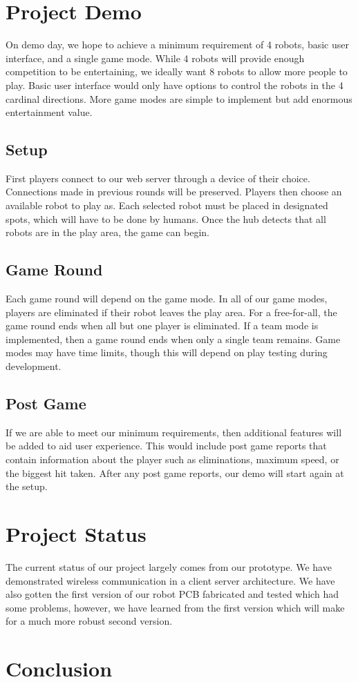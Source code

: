 \documentclass[11pt]{ieeeconf}
\begin{document}
\section{Project Demo}

On demo day, we hope to achieve a minimum requirement of 4 robots, basic user interface, and a single game mode. While 4 robots will provide enough competition to be entertaining, we ideally want 8 robots to allow more people to play. Basic user interface would only have options to control the robots in the 4 cardinal directions. More game modes are simple to implement but add enormous entertainment value.

\subsection{Setup}
First players connect to our web server through a device of their choice. Connections made in previous rounds will be preserved. Players then choose an available robot to play as. Each selected robot must be placed in designated spots, which will have to be done by humans. Once the hub detects that all robots are in the play area, the game can begin. 

\subsection{Game Round}
Each game round will depend on the game mode. In all of our game modes, players are eliminated if their robot leaves the play area. For a free-for-all, the game round ends when all but one player is eliminated. If a team mode is implemented, then a game round ends when only a single team remains. Game modes may have time limits, though this will depend on play testing during development.

\subsection{Post Game}
If we are able to meet our minimum requirements, then additional features will be added to aid user experience. This would include post game reports that contain information about the player such as eliminations, maximum speed, or the biggest hit taken. After any post game reports, our demo will start again at the setup.

\section{Project Status}
The current status of our project largely comes from our prototype. We have demonstrated wireless communication in a client server architecture. We have also gotten the first version of our robot PCB fabricated and tested which had some problems, however, we have learned from the first version which will make for a much more robust second version. 

\section{Conclusion}



\end{document}

